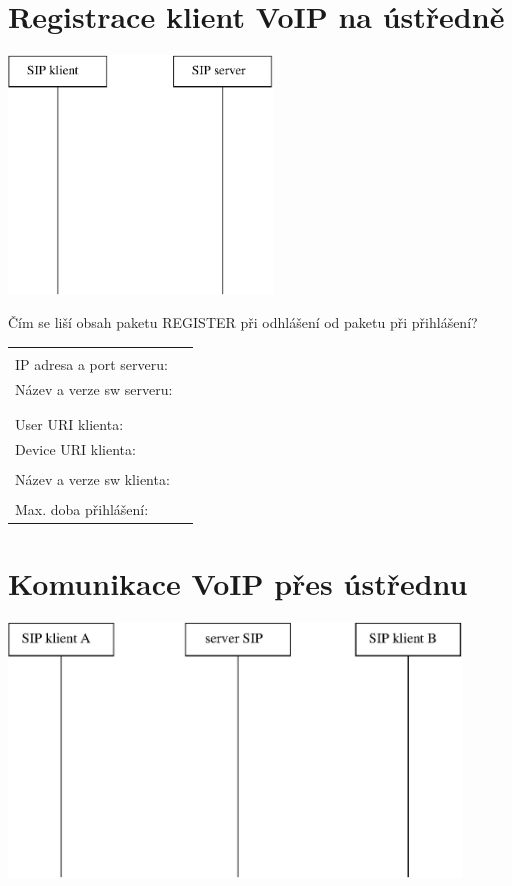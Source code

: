 \section{Registrace klient VoIP na ústředně}
\begin{multicols}{2}
  \begin{center}
    \includegraphics[width=70mm]{registrace.eps}
  \end{center}
    Čím se liší obsah paketu REGISTER při odhlášení od paketu při přihlášení?
  \columnbreak
  
  \begin{tabular}{lp{2cm}}
    &\\
    IP adresa a port serveru: &\\
    Název a verze sw serveru: &\\
    &\\
    &\\
    User URI klienta: &\\
    Device URI klienta: &\\
    &\\
    Název a verze sw klienta: &\\
    &\\
    Max. doba přihlášení: &\\
  \end{tabular}               
\end{multicols}

\section{Komunikace VoIP přes ústřednu}
  \begin{center}    
    \includegraphics[width=120mm]{pres-ustrednu.eps}
  \end{center}
  \vspace{1cm}

